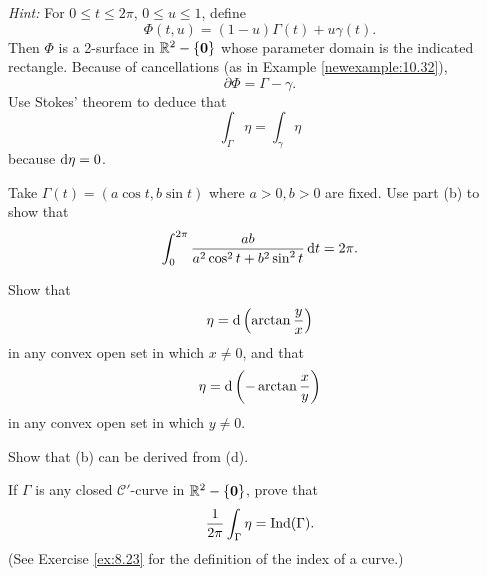 \begin{myexercise}
\begin{asparaenum}[(a)]
            \emph{Hint:} For $0 \leq t \leq 2\pi$, $0 \leq u \leq 1$, define
            \begin{equation*}
                \Phi(t,u)=(1-u)\Gamma(t)+u\gamma(t).
            \end{equation*}
            Then $\Phi$ is a 2-surface in ${\protect\mathbb R}^2 - \{\mathbf{0}\}$ whose parameter domain is the indicated rectangle.
            Because of cancellations (as in Example \ref{newexample:10.32}),
            \begin{equation*}
                \partial \Phi = \Gamma - \gamma .
            \end{equation*}
            Use Stokes' theorem to deduce that
            \begin{equation*}
                \int_{\Gamma} \eta =
                \int_{\gamma} \eta
            \end{equation*}
            because $\d \eta = 0$.
            \item Take $\Gamma(t)=(a \cos t, b \sin t)$ where $a>0,b>0$ are fixed. Use part (b) to show that
            \begin{equation*}
                \int_{0}^{2\pi} \frac{ab}{a^2\cos^2 t + b^2 \sin^2 t} \d t = 2 \pi .
            \end{equation*}
            \item Show that
            \begin{equation*}
                \eta = \d \left( \arctan\frac{y}{x} \right)
            \end{equation*}
            in any convex open set in which $x \neq 0$, and that
            \begin{equation*}
                \eta = \d \left( -\arctan\frac{x}{y} \right)
            \end{equation*}
            in any convex open set in which $y \neq 0$.
            \item Show that (b) can be derived from (d).
            \item If $\Gamma$ is any closed $\mathscr{C}'$-curve in ${\protect\mathbb R}^2 - \{\mathbf{0}\}$, prove that
        \begin{equation*}
            \frac{1}{2\pi} \int_{\Gamma} \eta = \operatorname{\operatorname{Ind}} (\Gamma).
        \end{equation*}
        (See Exercise \ref{ex:8.23} for the definition of the index of a curve.)
    \end{asparaenum}
\end{myexercise}


